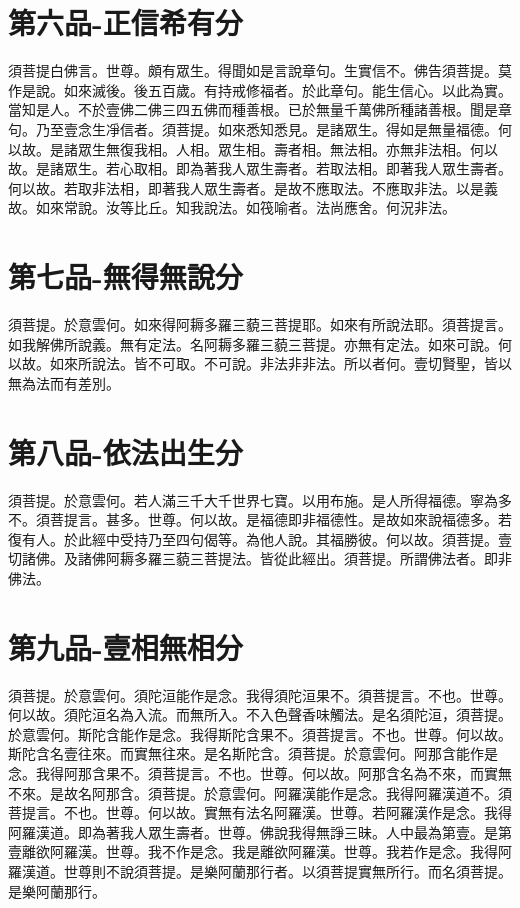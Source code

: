 \documentclass[a6paper, 22pt, twocolumn]{cvertbook}
\begin{document}
\chapter{第六品-正信希有分}
\large 須菩提白佛言。世尊。頗有眾生。得聞如是言說章句。生實信不。佛告須菩提。莫作是說。如來滅後。後五百歲。有持戒修福者。於此章句。能生信心。以此為實。當知是人。不於壹佛二佛三四五佛而種善根。已於無量千萬佛所種諸善根。聞是章句。乃至壹念生凈信者。須菩提。如來悉知悉見。是諸眾生。得如是無量福德。何以故。是諸眾生無復我相。人相。眾生相。壽者相。無法相。亦無非法相。何以故。是諸眾生。若心取相。即為著我人眾生壽者。若取法相。即著我人眾生壽者。何以故。若取非法相，即著我人眾生壽者。是故不應取法。不應取非法。以是義故。如來常說。汝等比丘。知我說法。如筏喻者。法尚應舍。何況非法。
\chapter{第七品-無得無說分}
\large 須菩提。於意雲何。如來得阿耨多羅三藐三菩提耶。如來有所說法耶。須菩提言。如我解佛所說義。無有定法。名阿耨多羅三藐三菩提。亦無有定法。如來可說。何以故。如來所說法。皆不可取。不可說。非法非非法。所以者何。壹切賢聖，皆以無為法而有差別。
\chapter{第八品-依法出生分}
\large 須菩提。於意雲何。若人滿三千大千世界七寶。以用布施。是人所得福德。寧為多不。須菩提言。甚多。世尊。何以故。是福德即非福德性。是故如來說福德多。若復有人。於此經中受持乃至四句偈等。為他人說。其福勝彼。何以故。須菩提。壹切諸佛。及諸佛阿耨多羅三藐三菩提法。皆從此經出。須菩提。所謂佛法者。即非佛法。
\chapter{第九品-壹相無相分}
\large 須菩提。於意雲何。須陀洹能作是念。我得須陀洹果不。須菩提言。不也。世尊。何以故。須陀洹名為入流。而無所入。不入色聲香味觸法。是名須陀洹，須菩提。於意雲何。斯陀含能作是念。我得斯陀含果不。須菩提言。不也。世尊。何以故。斯陀含名壹往來。而實無往來。是名斯陀含。須菩提。於意雲何。阿那含能作是念。我得阿那含果不。須菩提言。不也。世尊。何以故。阿那含名為不來，而實無不來。是故名阿那含。須菩提。於意雲何。阿羅漢能作是念。我得阿羅漢道不。須菩提言。不也。世尊。何以故。實無有法名阿羅漢。世尊。若阿羅漢作是念。我得阿羅漢道。即為著我人眾生壽者。世尊。佛說我得無諍三昧。人中最為第壹。是第壹離欲阿羅漢。世尊。我不作是念。我是離欲阿羅漢。世尊。我若作是念。我得阿羅漢道。世尊則不說須菩提。是樂阿蘭那行者。以須菩提實無所行。而名須菩提。是樂阿蘭那行。
\end{document}

